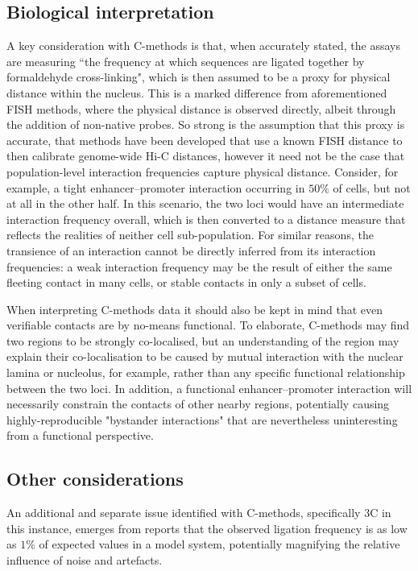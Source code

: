 \documentclass[a4paper,11pt,oneside]{book}
\begin{document}
\subsection{Biological interpretation}
A key consideration with C-methods is that, when accurately stated, the assays are measuring ``the frequency at which sequences are ligated together by formaldehyde cross-linking",\cite{Williamson2014} which is then assumed to be a proxy for physical distance within the nucleus. This is a marked difference from aforementioned FISH methods, where the physical distance is observed directly, albeit through the addition of non-native probes. So strong is the assumption that this proxy is accurate, that methods have been developed that use a known FISH distance to then calibrate genome-wide Hi-C distances,\cite{Shavit2014} however it need not be the case that population-level interaction frequencies capture physical distance.\cite{Lajoie2014} Consider, for example, a tight enhancer--promoter interaction occurring in $50\%$ of cells, but not at all in the other half. In this scenario, the two loci would have an intermediate interaction frequency overall, which is then converted to a distance measure that reflects the realities of neither cell sub-population. For similar reasons, the transience of an interaction cannot be directly inferred from its interaction frequencies: a weak interaction frequency may be the result of either the same fleeting contact in many cells, or stable contacts in only a subset of cells.\cite{Lajoie2014}


When interpreting C-methods data it should also be kept in mind that even verifiable contacts are by no-means functional. To elaborate, C-methods may find two regions to be strongly co-localised, but an understanding of the region may explain their co-localisation to be caused by mutual interaction with the nuclear lamina or nucleolus, for example, rather than any specific functional relationship between the two loci.\cite{Dekker2013} In addition, a functional enhancer--promoter interaction will necessarily constrain the contacts of other nearby regions, potentially causing highly-reproducible "bystander interactions"\cite{Dekker2013} that are nevertheless uninteresting from a functional perspective. 

\subsection{Other considerations}
An additional and separate issue identified with C-methods, specifically 3C in this instance, emerges from reports that the observed ligation frequency is as low as $1\%$ of expected values in a model system,\cite{Gavrilov2013} potentially magnifying the relative influence of noise and artefacts.
\end{document}
